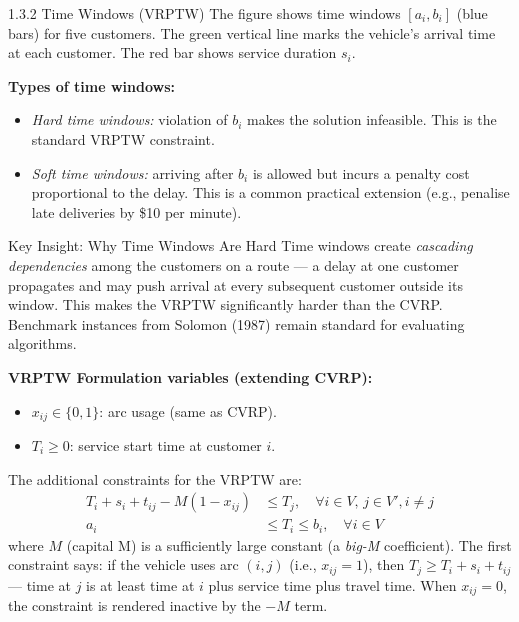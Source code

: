 \documentclass[aspectratio=169,10pt]{beamer}
\begin{document}
\begin{frame}[allowframebreaks]{1.3.2 Time Windows (VRPTW)}
The figure shows time windows $[a_i, b_i]$ (blue bars) for five customers.  The green
vertical line marks the vehicle's arrival time at each customer.  The red bar shows
service duration $s_i$.

\medskip
\textbf{Types of time windows:}
\begin{itemize}
  \item \emph{Hard time windows:} violation of $b_i$ makes the solution infeasible.
        This is the standard VRPTW constraint.
  \item \emph{Soft time windows:} arriving after $b_i$ is allowed but incurs a
        penalty cost proportional to the delay.  This is a common practical
        extension (e.g., penalise late deliveries by \$10 per minute).
\end{itemize}

\begin{alertblock}{Key Insight: Why Time Windows Are Hard}
Time windows create \emph{cascading dependencies} among the customers on a route ---
a delay at one customer propagates and may push arrival at every subsequent customer
outside its window.  This makes the VRPTW significantly harder than the CVRP.
Benchmark instances from Solomon (1987) remain standard for evaluating algorithms.
\end{alertblock}

\framebreak

\textbf{VRPTW Formulation variables (extending CVRP):}
\begin{itemize}
  \item $x_{ij} \in \{0,1\}$: arc usage (same as CVRP).
  \item $T_i \geq 0$: service start time at customer $i$.
\end{itemize}

The additional constraints for the VRPTW are:
\begin{align*}
  T_i + s_i + t_{ij} - M(1 - x_{ij}) &\leq T_j,
  \quad \forall i \in V,\, j \in V', i \neq j\\
  a_i &\leq T_i \leq b_i, \quad \forall i \in V
\end{align*}
where $M$ (capital M) is a sufficiently large constant (a \emph{big-M} coefficient).
The first constraint says: if the vehicle uses arc $(i,j)$ (i.e., $x_{ij}=1$), then
$T_j \geq T_i + s_i + t_{ij}$ --- time at $j$ is at least time at $i$ plus service
time plus travel time.  When $x_{ij}=0$, the constraint is rendered inactive by the
$-M$ term.

\end{frame}
\end{document}
